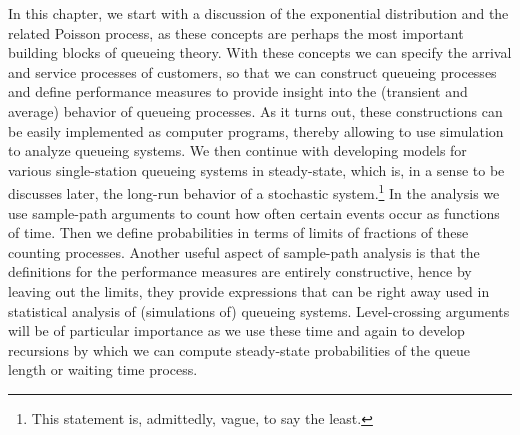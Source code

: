 In this chapter, we start with a discussion of the exponential
distribution and the related Poisson process, as these concepts are
perhaps the most important building blocks of queueing theory. With
these concepts we can specify the arrival and service processes of
customers, so that we can construct queueing processes and define
performance measures to provide insight into the (transient and
average) behavior of queueing processes. As it turns out, these
constructions can be easily implemented as computer programs, thereby
allowing to use simulation to analyze queueing systems. We then
continue with developing models for various single-station queueing
systems in steady-state, which is, in a sense to be discusses later,
the long-run behavior of a stochastic system.\footnote{This statement
is, admittedly, vague, to say the least.} In the analysis we use
sample-path arguments to count how often certain events occur as
functions of time. Then we define probabilities in terms of limits of
fractions of these counting processes. Another useful aspect of
sample-path analysis is that the definitions for the performance
measures are entirely constructive, hence by leaving out the limits,
they provide expressions that can be right away used in statistical
analysis of (simulations of) queueing systems. Level-crossing
arguments will be of particular importance as we use these time and
again to develop recursions by which we can compute steady-state
probabilities of the queue length or waiting time process.


